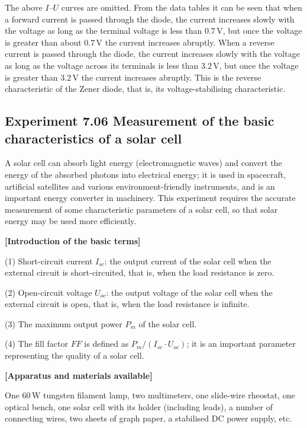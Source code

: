 The above $I$--$U$ curves are omitted. From the data tables it can be seen that when a forward current is passed through the diode, the current increases slowly with the voltage as long as the terminal voltage is less than $0.7\,\mathrm{V}$, but once the voltage is greater than about $0.7\,\mathrm{V}$ the current increases abruptly. When a reverse current is passed through the diode, the current increases slowly with the voltage as long as the voltage across its terminals is less than $3.2\,\mathrm{V}$, but once the voltage is greater than $3.2\,\mathrm{V}$ the current increases abruptly. This is the reverse characteristic of the Zener diode, that is, its voltage-stabilising characteristic.

\subsection*{Experiment 7.06 \quad Measurement of the basic characteristics of a solar cell}

A solar cell can absorb light energy (electromagnetic waves) and convert the energy of the absorbed photons into electrical energy; it is used in spacecraft, artificial satellites and
various environment-friendly instruments, and is an important energy converter in machinery. This experiment requires the accurate measurement of some characteristic parameters of a solar cell, so that solar energy may be used more efficiently.

\textbf{[Introduction of the basic terms]}

(1) Short-circuit current $I_{sc}$: the output current of the solar cell when the external circuit is short-circuited, that is, when the load resistance is zero.

(2) Open-circuit voltage $U_{oc}$: the output voltage of the solar cell when the external circuit is open, that is, when the load resistance is infinite.

(3) The maximum output power $P_m$ of the solar cell.

(4) The fill factor $FF$ is defined as $P_m/(I_{sc}\cdot U_{oc})$; it is an important parameter representing the quality of a solar cell.

\textbf{[Apparatus and materials available]}

One 60\,W tungsten filament lamp, two multimeters, one slide-wire rheostat, one optical bench, one solar cell with its holder (including leads), a number of connecting wires, two sheets of graph paper, a stabilised DC power supply, etc.

